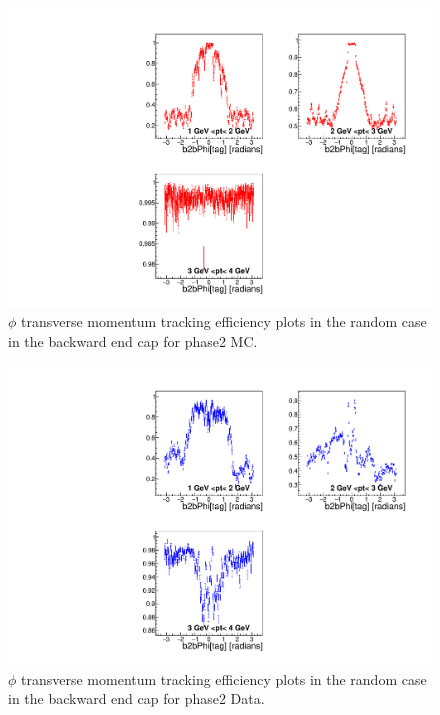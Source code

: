 \documentclass[a4paper,11pt,twosided,final,german,openbib,pdftex,listof=totoc,bibliography=totoc]{scrbook}
\begin{document}
\begin{appendix}
\clearpage
\begin{figure}[!htbp]
	\centering
	\includegraphics[width=\textwidth]{Plots/master/xPtMPhiRandomEC_MC}
	\caption[Transverse Momentum $\phi$ Random Backward End Cap Efficiency Phase2 MC]{$\phi$ transverse momentum tracking efficiency plots in the random case in the backward end cap for phase2 MC.}
	\label{plt:PtMPhiRandomEC_MC}
\end{figure}


\begin{figure}[!htbp]
	\centering
	\includegraphics[width=\textwidth]{Plots/master/xPtMPhiRandomEC_Data}
	\caption[Transverse Momentum $\phi$ Random Backward End Cap Efficiency Phase2 Data]{$\phi$ transverse momentum tracking efficiency plots in the random case in the backward end cap for phase2 Data.}
	\label{plt:PtMPhiRandomEC_Data}
\end{figure}



\end{appendix}
\end{document}

